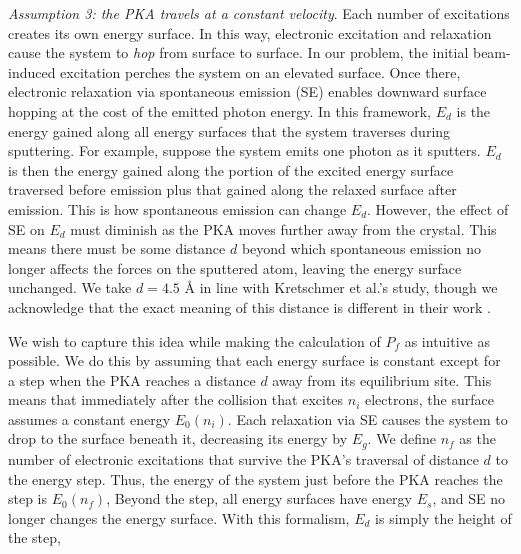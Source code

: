 \documentclass{article}
\begin{document}
\medskip\noindent
\textit{Assumption 3: the PKA travels at a constant velocity}.
Each number of excitations creates its own energy surface.  In this way,
electronic excitation and relaxation cause the system to \textit{hop} from
surface to surface.  In our problem, the initial beam-induced excitation
perches the system on an elevated surface.  Once there, electronic relaxation
via spontaneous emission (SE) enables downward surface hopping at the cost
of the emitted photon energy.
In this framework, $E_d$ is the energy gained along all energy surfaces
that the system traverses during sputtering.  For example, suppose the system
emits one photon as it sputters.  $E_d$ is then the energy gained along the
portion of the excited energy surface traversed before emission plus that
gained along the relaxed surface after emission.
This is how spontaneous emission can change $E_d$.
However, the effect of SE on $E_d$ must diminish as the PKA moves further away
from the crystal.
This means there must be some distance $d$ beyond which spontaneous emission no
longer affects the forces on the sputtered atom, leaving the energy surface
unchanged.
We take $d=4.5$ {\AA} in line with Kretschmer et al.'s study, though we
acknowledge that the exact meaning of this distance is different in their work
\cite{Kretschmer2020}.

We wish to capture this idea while making the calculation of $P_f$ as
intuitive as possible.
We do this by assuming that each energy surface is constant except for a step
when the PKA reaches a distance $d$ away from its equilibrium site.
This means that immediately after the collision that excites $n_i$ electrons,
the surface assumes a constant energy $E_0(n_i)$.
Each relaxation via SE causes the system to drop to the surface beneath it,
decreasing its energy by $E_g$.
We define $n_f$ as the number of electronic excitations that survive the PKA's
traversal of distance $d$ to the energy step.
Thus, the energy of the system just before the PKA reaches the step is
$E_0(n_f)$,
Beyond the step, all energy surfaces have energy $E_s$, and SE no longer
changes the energy surface. 
With this formalism, $E_d$ is simply the height of the step,
\end{document}
